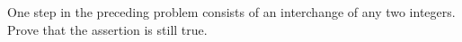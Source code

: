 One step in the preceding problem consists of an interchange of any two integers. Prove that the assertion is still true.
